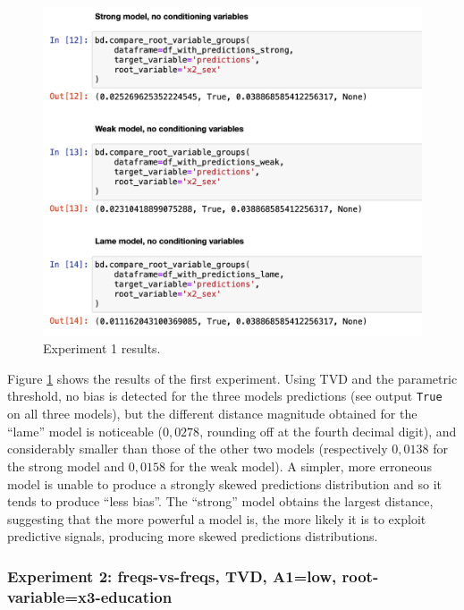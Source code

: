 \documentclass[
]{ceurart}
\begin{document}
\begin{figure}[h!]
  \includegraphics[width=.8\linewidth, left]{exp1.png}
  \caption{Experiment 1 results.}
  \label{fig:exp1}
\end{figure}
Figure \ref{fig:exp1} shows the results of the first experiment. Using TVD and the parametric threshold, no bias is detected for the three models predictions (see output \texttt{True} on all three models), but the different distance magnitude obtained for the ``lame'' model is noticeable ($0,0278$, rounding off at the fourth decimal digit), and considerably smaller than those of the other two models (respectively $0,0138$ for the strong model and $0,0158$ for the weak model). A simpler, more erroneous model is unable to produce a strongly skewed predictions distribution and so it tends to produce ``less bias''. The ``strong'' model obtains the largest distance, suggesting that the more powerful a model is, the more likely it is to exploit predictive signals, producing more skewed predictions distributions. 

\subsubsection{Experiment 2: freqs-vs-freqs, TVD, A1=low, root-variable=x3-education}
\end{document}
